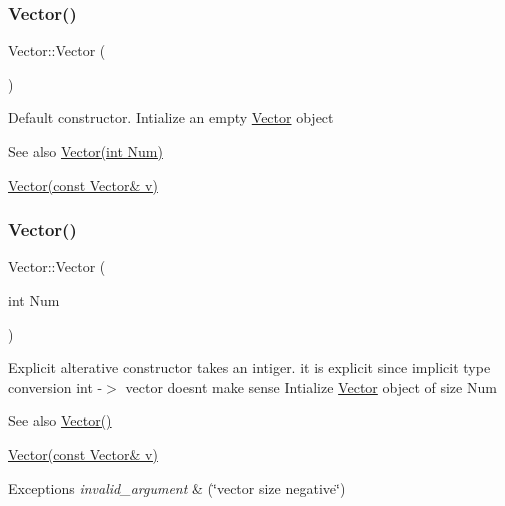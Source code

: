 \subsubsection{\texorpdfstring{Vector()}{Vector()}\hspace{0.1cm}{\footnotesize\ttfamily [1/3]}}
{\footnotesize\ttfamily Vector\+::\+Vector (\begin{DoxyParamCaption}{ }\end{DoxyParamCaption})}

Default constructor. Intialize an empty \hyperlink{class_vector}{Vector} object \begin{DoxySeeAlso}{See also}
\hyperlink{class_vector_acbdf66550f2caa0a64e0b356fb63a277}{Vector(int Num)} 

\hyperlink{class_vector_a5f04e343b7306ad11f8a82c89b486764}{Vector(const Vector\& v)} 
\end{DoxySeeAlso}
\mbox{\label{class_vector_acbdf66550f2caa0a64e0b356fb63a277}} 
\subsubsection{\texorpdfstring{Vector()}{Vector()}\hspace{0.1cm}{\footnotesize\ttfamily [2/3]}}
{\footnotesize\ttfamily Vector\+::\+Vector (\begin{DoxyParamCaption}\item[{int}]{Num }\end{DoxyParamCaption})\hspace{0.3cm}{\ttfamily [explicit]}}

Explicit alterative constructor takes an intiger. it is explicit since implicit type conversion int -\/$>$ vector doesn\textquotesingle{}t make sense Intialize \hyperlink{class_vector}{Vector} object of size Num \begin{DoxySeeAlso}{See also}
\hyperlink{class_vector_a6f80c73b5f18dcf3f8e36065bdc8b9e5}{Vector()} 

\hyperlink{class_vector_a5f04e343b7306ad11f8a82c89b486764}{Vector(const Vector\& v)} 
\end{DoxySeeAlso}

\begin{DoxyExceptions}{Exceptions}
{\em invalid\+\_\+argument} & (\char`\"{}vector size negative\char`\"{}) \\
\hline
\end{DoxyExceptions}

